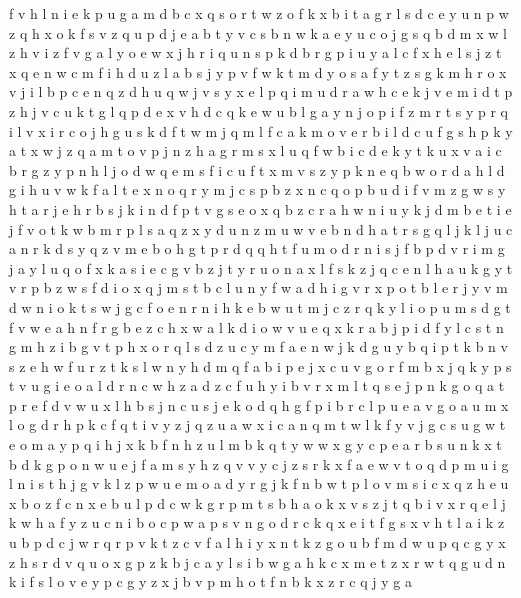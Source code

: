 \documentclass{article}
\begin{document}
f v h l n i e k p u g a m d b c x q s o r t w z
o f k x b i t a g r l s d c e y u n p w z q
h x o k f s v z q u p d j e a b t
y v c s b n w k
a e y u c o j g s q b d m x w l z h v i
z f v g a l y o e w x j h r i q u n s p k d
b r g p i u y a l c f
x h e l s j z
t x q e n w c m f i h d u z l a b s j y p v
f w k t m d y o s
a f y t z s g k m h r o x v j i l b p c e n q
z d h u q w j v s y x e
l p q i m u d r a w h c e k j
v e m i d t p z
h j v c u k t g l q p d e
x v h d c q k e w u b l g a y n j o p i f z m r t s
y p r
q i
l v x i r c o j h g u s k d f t w m
j q m l f c a
k
m o v e r b i l d c u f g s h p k y a t x w j z q
a m
t o v p j n z h a g r m s x l u q f w b i c d e k y
t k u x v a i c b r g z y p n h l j o d w q e m s f
i c u f t x m v s z y p k n e q b w o r d a h l
d g i h u v w k f a l t e x n o q r y m j c s p b z
x n c q o p b u d i f v m z g w s y h t a r j e
h r b s j k i n d
f p t v g s e o x q b z c r a h w n i u y k j d m
b e t
i e j f v o t k w b m r p l s a q z x y d u n
z m u w v e b n d h a t r s g q l j k
l j u c a n r k d s y q z v m e b o h g t
p r d q
q h t f u m o d r n i s j
f b p d v r i m g j a y
l u q o f x k a s i e c g v b z j
t y r u o n a x l f s k z
j q c e n l h a u k g y t v r p b z w s f d i o x
q j m s t b c l u n y f w a d h i g v r x p o
t b l e r j y v m d w n i o k
t s w j g c f o e n
r n
i h k e b w u t m j
c z r q k y l i o p u m s d g t f v w e a h
n f r g b e z c h x w a l k d i
o w v u e q x k r a b j p i d f y l c s t n g m h z
i b g v t p h x o r q l s d z u c y m f a e n w j k
d g u y b q i
p t k b n v s z e h w f u r
z t k s l w n y h d m q f a b i p e j x c u v g o r
f m b x j q k y p s t v u g i e o a l d r n c w h z
a d z c f u h y i b v r x m l t q s e j p n k g o
q a t p r e f d v w u x l h b s j n c
u s j e k o d q h g f p i b
r c l p u e a v g o
a u m x l o g d r h p k c f q t i v y z j
q z u a w
x i c a n q m t w l k f y v j g
c s u g w t e o m a y p q i h j x k b f n
h z u l
m b k q t y w
w x g y c p e a r b s u
n k
x t b d k g p o n w u e j f a m s y h z q v
v
y c j z s r k x f a e w v t o q d p m u i g l
n i s t h j g v k l z p w u e m o
a d y r g j k f n b w t p l o v m s i c x q z h e u
x b o z f c
n x e b u l p d c w k g
r p m t s b h a o
k x v
s z j t q b i v
x r q e l j k w h a f y z u c n i b o
c p w
a p s v n g o d r c k q x e i t
f g s x v h t l a i k z u b p d c j w r
q r p v k t z c
v f a l h i y x n t k z g o u b
f m d w u p q c g y x z h
s r d v q u o x g p z k b j c a y
l s i b w g a h k c x m e t
z x r w t q g u d n k i f s l o v e y p c
g y z x j b v
p m h o t f n b k x z r c q j y g a
\end{document}
